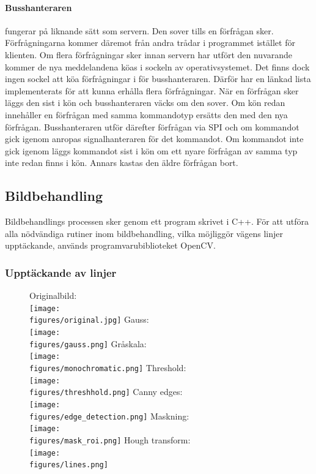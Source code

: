 \documentclass[tekniskrapport/tech.tex]{subfiles}
\begin{document}
\paragraph{Busshanteraren} fungerar på liknande sätt som servern. Den sover
tills en förfrågan sker. Förfrågningarna kommer däremot från andra trådar i
programmet istället för klienten. Om flera förfrågningar sker innan servern har
utfört den nuvarande kommer de nya meddelandena köas i sockeln av
operativsystemet. Det finns dock ingen sockel att köa förfrågningar i för
busshanteraren. Därför har en länkad lista implementerats för att kunna erhålla
flera förfrågningar. När en förfrågan sker läggs den sist i kön och
busshanteraren väcks om den sover. Om kön redan innehåller en förfrågan med
samma kommandotyp ersätts den med den nya förfrågan. Busshanteraren utför
därefter förfrågan via SPI och om kommandot gick igenom anropas
signalhanteraren för det kommandot. Om kommandot inte gick igenom läggs
kommandot sist i kön om ett nyare förfrågan av samma typ inte redan finns i
kön. Annars kastas den äldre förfrågan bort.

\subsection{Bildbehandling}
Bildbehandlings processen sker genom ett program skrivet i C++. För att utföra
alla nödvändiga rutiner inom bildbehandling, vilka möjliggör vägens linjer
upptäckande, används programvarubiblioteket OpenCV.

\subsubsection{Upptäckande av linjer}

\begin{figure}
    \vspace*{-5mm}
    Originalbild:\\[1mm]
    \texttt{[image: \\figures/original.jpg]}
    \label{fig:gauss}
    Gauss:\\[1mm]
    \texttt{[image: \\figures/gauss.png]}
    \label{fig:gauss}
    Gråskala:\\[1mm]
    \texttt{[image: \\figures/monochromatic.png]}
    \label{fig:monochromatic}
    Threshold:\\[1mm]
    \texttt{[image: \\figures/threshhold.png]}
    \label{fig:threshhold}
    Canny edges:\\[1mm]
    \texttt{[image: \\figures/edge\_detection.png]}
    \label{fig:edge_det}
    Maskning:\\[1mm]
    \texttt{[image: \\figures/mask\_roi.png]}
    \label{fig:mask}
    Hough transform:\\[1mm]
    \texttt{[image: \\figures/lines.png]}
    \label{fig:lines}
\end{figure}
\end{document}
